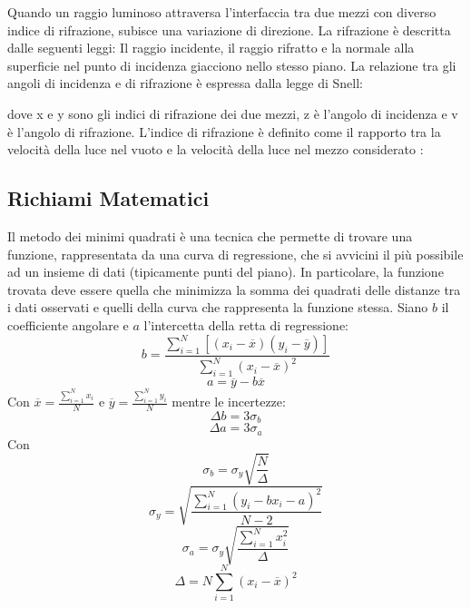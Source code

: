 Quando un raggio luminoso attraversa l'interfaccia tra due mezzi con diverso indice di rifrazione, 
subisce una variazione di direzione. La rifrazione è descritta dalle seguenti leggi:
Il raggio incidente, il raggio rifratto e la normale alla superficie nel punto di incidenza giacciono nello stesso piano.
La relazione tra gli angoli di incidenza e di rifrazione è espressa dalla legge di Snell:



dove x  e y sono gli indici di rifrazione dei due mezzi, z è l'angolo di incidenza e v è l'angolo di rifrazione.
L'indice di rifrazione  è definito come il rapporto tra la velocità della luce nel vuoto  
e la velocità della luce nel mezzo considerato :



\subsection{Richiami Matematici}
Il metodo dei minimi quadrati è una tecnica che permette di trovare una funzione, rappresentata da una curva di regressione, che si avvicini il più possibile ad un insieme di dati (tipicamente punti del piano). In particolare, la funzione trovata deve essere quella che minimizza la somma dei quadrati delle distanze tra i dati osservati e quelli della curva che rappresenta la funzione stessa. Siano $b$ il coefficiente angolare e $a$ l'intercetta della retta di regressione:
\begin{equation}
    b=\frac{\displaystyle\sum_{i=1}^{N}[(x_i-\overline{x})(y_i-\overline{y})]}{\displaystyle\sum_{i=1}^{N}(x_i-\overline{x})^2}
\end{equation}
\begin{equation}
    a=\overline{y}-b\overline{x}
\end{equation}
Con $\overline{x}=\frac{\displaystyle\sum_{i=1}^{N}x_i}{N}$ e $\overline{y}=\frac{\displaystyle\sum_{i=1}^{N}y_i}{N}$
mentre le incertezze:
\begin{equation}
    \Delta b=3\sigma_b
\end{equation}
\begin{equation}
    \Delta a=3\sigma_a
\end{equation}
Con $$\sigma_b=\sigma_y\sqrt{\frac{N}{\Delta}}$$
$$\sigma_y=\sqrt{\frac{\displaystyle\sum_{i=1}^{N}(y_i-bx_i-a)^2}{N-2}}$$
$$\sigma_a=\sigma_y\sqrt{\frac{\displaystyle\sum_{i=1}^{N}x_i^2}{\Delta}}$$
$$\Delta=N\displaystyle\sum_{i=1}^{N}(x_i-\overline{x})^2$$

